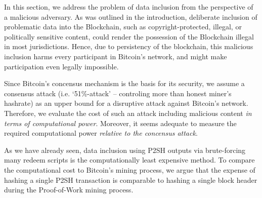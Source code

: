 \documentclass[10pt,a4paper,twocolumn]{article}
\begin{document}
In this section, we address the problem of data inclusion from the perspective of a malicious adversary.
As was outlined in the introduction, deliberate inclusion of problematic data into the Blockchain, such as copyright-protected, illegal, or politically sensitive content, could render the possession of the Blockchain illegal in most jurisdictions.
Hence, due to persistency of the blockchain, this malicious inclusion harms every participant in Bitcoin's network, and might make participation even legally impossible.

Since Bitcoin's concensus mechanism is the basis for its security, we assume a consensus attack (i.e. \enquote*{51\%-attack} – controling more than honest miner's hashrate) as an upper bound for a disruptive attack against Bitcoin's network.
Therefore, we evaluate the cost of such an attack including malicious content \emph{in terms of computational power}.
Moreover, it seems adequate to measure the required computational power \emph{relative to the concensus attack}.

As we have already seen, data inclusion using {P2SH} outputs via brute-forcing many redeem scripts is the computationally least expensive method.
To compare the computational cost to Bitcoin's mining process, we argue that the expense of hashing a single {P2SH} transaction is comparable to hashing a single block header during the Proof-of-Work mining process.


\end{document}
